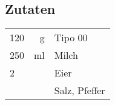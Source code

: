 \subsection*{Zutaten}
\begin{tabular}{lrl}
    120 &          g & Tipo 00                      \\
    250 &         ml & Milch                             \\
    2   &            & Eier                                  \\
    &            & Salz, Pfeffer                                \\
\end{tabular} 
